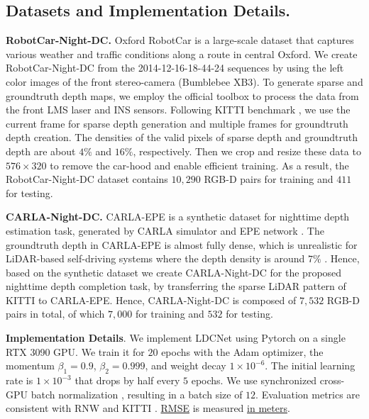 \documentclass[lettersize,journal]{IEEEtran}
\begin{document}
\subsection{Datasets and Implementation Details.} 

\textbf{RobotCar-Night-DC.} Oxford RobotCar \cite{maddern20171} is a large-scale dataset that captures various weather and traffic conditions along a route in central Oxford. We create RobotCar-Night-DC from the 2014-12-16-18-44-24 sequences by using the left color images of the front stereo-camera (Bumblebee XB3). To generate sparse and groundtruth depth maps, we employ the official toolbox to process the data from the front LMS laser and INS sensors. Following KITTI benchmark \cite{Uhrig2017THREEDV}, we use the current frame for sparse depth generation and multiple frames for groundtruth depth creation. The densities of the valid pixels of sparse depth and groundtruth depth are about $4\%$ and $16\%$, respectively. Then we crop and resize these data to $576\times 320$ to remove the car-hood and enable efficient training. As a result, the RobotCar-Night-DC dataset contains $10,290$ RGB-D pairs for training and $411$ for testing. 

\textbf{CARLA-Night-DC.} CARLA-EPE \cite{zheng2023steps} is a synthetic dataset for nighttime depth estimation task, generated by CARLA simulator \cite{dosovitskiy2017carla} and EPE network \cite{richter2022enhancing}. The groundtruth depth in CARLA-EPE is almost fully dense, which is unrealistic for LiDAR-based self-driving systems where the depth density is around $7\%$ \cite{yan2022rignet}. Hence, based on the synthetic dataset we create CARLA-Night-DC for the proposed nighttime depth completion task, by transferring the sparse LiDAR pattern of KITTI \cite{Uhrig2017THREEDV} to CARLA-EPE. Hence, CARLA-Night-DC is composed of $7,532$ RGB-D pairs in total, of which $7,000$ for training and $532$ for testing. 

\textbf{Implementation Details}. We implement LDCNet using Pytorch on a single RTX 3090 GPU. We train it for $20$ epochs with the Adam optimizer, the momentum $\beta_{1}=0.9$, $\beta_{2}=0.999$, and weight decay $1 \times {10}^{-6}$. The initial learning rate is $1 \times {10}^{-3}$ that drops by half every $5$ epochs. We use synchronized cross-GPU batch normalization \cite{ioffe2015batch}, resulting in a batch size of $12$. Evaluation metrics are consistent with RNW \cite{wang2021regularizing} and KITTI \cite{Uhrig2017THREEDV}. \underline{RMSE} is measured \underline{in meters}. %
\end{document}
